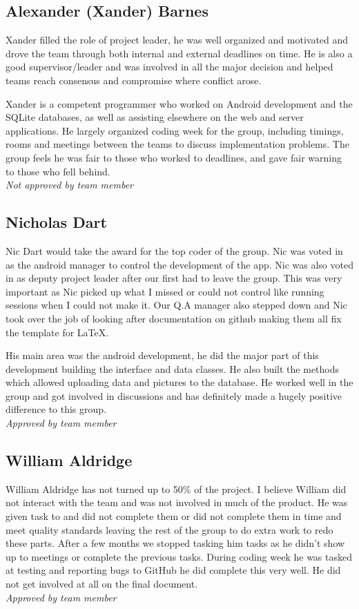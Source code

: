 \subsection{Alexander (Xander) Barnes}
    Xander filled the role of project leader, he was well organized and motivated and drove the team through both internal and external deadlines on time. He is also a good supervisor/leader and was involved in all the major decision and helped teams reach consensus and compromise where conflict arose.

    Xander is a competent programmer who worked on Android development and the SQLite databases, as well as assisting elsewhere on the web and server applications. He largely organized coding week for the group, including timings, rooms and meetings between the teams to discuss implementation problems. The group feels he was fair to those who worked to deadlines, and gave fair warning to those who fell behind.\\
    \emph{Not approved by team member}

\subsection{Nicholas Dart}
    Nic Dart would take the award for the top coder of the group. Nic was voted in as the android manager to control the development of the app. Nic was also voted in as deputy project leader after our first had to leave the group. This was very important as Nic picked up what I missed or could not control like running sessions when I could not make it. Our Q.A manager also stepped down and Nic took over the job of looking after documentation on github making them all fix the template for \LaTeX.

    His main area was the android development, he did the major part of this development building the interface and data classes. He also built the methods which allowed uploading data and pictures to the database. He worked well in the group and got involved in discussions and has definitely made a hugely positive difference to this group.\\
    \emph{Approved by team member}
    
\subsection{William Aldridge}
    William Aldridge has not turned up to 50\% of the project. I believe William did not interact with the team and was not involved in much of the product. He was given task to and did not complete them or did not complete them in time and meet quality standards leaving the rest of the group to do extra work to redo these parts. After a few months we stopped tasking him tasks as he didn't show up to meetings or complete the previous tasks. During coding week he was tasked at testing and reporting bugs to GitHub he did complete this very well. He did not get involved at all on the final document.\\
    \emph{Approved by team member}

